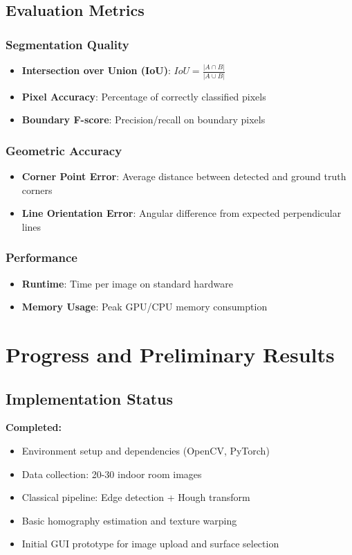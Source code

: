 \documentclass[11pt]{article}
\begin{document}
\subsection{Evaluation Metrics}

\subsubsection{Segmentation Quality}
\begin{itemize}
    \item \textbf{Intersection over Union (IoU)}: $IoU = \frac{|A \cap B|}{|A \cup B|}$
    \item \textbf{Pixel Accuracy}: Percentage of correctly classified pixels
    \item \textbf{Boundary F-score}: Precision/recall on boundary pixels
\end{itemize}

\subsubsection{Geometric Accuracy}
\begin{itemize}
    \item \textbf{Corner Point Error}: Average distance between detected and ground truth corners
    \item \textbf{Line Orientation Error}: Angular difference from expected perpendicular lines
\end{itemize}

\subsubsection{Performance}
\begin{itemize}
    \item \textbf{Runtime}: Time per image on standard hardware
    \item \textbf{Memory Usage}: Peak GPU/CPU memory consumption
\end{itemize}

\section{Progress and Preliminary Results}

\subsection{Implementation Status}

\textbf{Completed:}
\begin{itemize}
    \item Environment setup and dependencies (OpenCV, PyTorch)
    \item Data collection: 20-30 indoor room images
    \item Classical pipeline: Edge detection + Hough transform
    \item Basic homography estimation and texture warping
    \item Initial GUI prototype for image upload and surface selection
\end{itemize}
\end{document}
